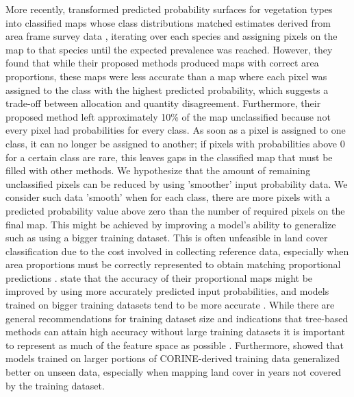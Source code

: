     More recently, \citet{horvath2021comparison} transformed predicted probability surfaces for vegetation types \citep{horvath2019distribution} into classified maps whose class distributions matched estimates derived from area frame survey data \citep{bryn2018land}, iterating over each species and assigning pixels on the map to that species until the expected prevalence was reached. However, they found that while their proposed methods produced maps with correct area proportions, these maps were less accurate than a map where each pixel was assigned to the class with the highest predicted probability, which suggests a trade-off between allocation and quantity disagreement. Furthermore, their proposed method left approximately 10\% of the map unclassified because not every pixel had probabilities for every class. 
    As soon as a pixel is assigned to one class, it can no longer be assigned to another; if pixels with probabilities above 0 for a certain class are rare, this leaves gaps in the classified map that must be filled with other methods.     
    We hypothesize that the amount of remaining unclassified pixels can be reduced by using 'smoother' input probability data. We consider such data 'smooth' when for each class, there are more pixels with a predicted probability value above zero than the number of required pixels on the final map. 
    This might be achieved by improving a model's ability to generalize such as using a bigger training dataset. This is often unfeasible in land cover classification due to the cost involved in collecting reference data, especially when area proportions must be correctly represented to obtain matching proportional predictions \citep{sales2022land,kleinewillinghofer2022unbiased}. \citet{horvath2021comparison} state that the accuracy of their proportional maps might be improved by using more accurately predicted input probabilities, and models trained on bigger training datasets tend to be more accurate \citep{myburgh2014impact,rodriguez-perez2017influence}. While there are general recommendations for training dataset size \citep{foody2006training,koshute2021recommending} and indications that tree-based methods can attain high accuracy without large training datasets \citep{ramezan2021effects} it is important to represent as much of the feature space as possible \citep{meyer2021predicting,wadoux2019sampling}. Furthermore, \citet{witjes2022spatiotemporal,witjes2023ecodatacube} showed that models trained on larger portions of CORINE-derived training data generalized better on unseen data, especially when mapping land cover in years not covered by the training dataset.
    
